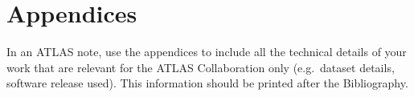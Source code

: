 \documentclass[NOTE, atlasdraft=true, texlive=2016, UKenglish]{atlasdoc}
\begin{document}
\clearpage
\appendix
\part*{Appendices}

In an ATLAS note, use the appendices to include all the technical details of your work
that are relevant for the ATLAS Collaboration only (e.g.\ dataset details, software release used).
This information should be printed after the Bibliography.
\end{document}
